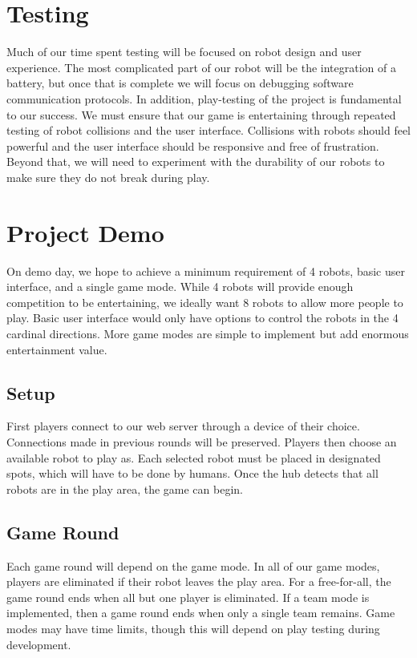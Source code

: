 \documentclass[11pt]{ieeeconf}
\begin{document}
\section{Testing}
Much of our time spent testing will be focused on robot design and user experience. The most complicated part of our robot will be the integration of a battery, but once that is complete we will focus on debugging software communication protocols. In addition, play-testing of the project is fundamental to our success. We must ensure that our game is entertaining through repeated testing of robot collisions and the user interface. Collisions with robots should feel powerful and the user interface should be responsive and free of frustration. Beyond that, we will need to experiment with the durability of our robots to make sure they do not break during play.

\section{Project Demo}

On demo day, we hope to achieve a minimum requirement of 4 robots, basic user interface, and a single game mode. While 4 robots will provide enough competition to be entertaining, we ideally want 8 robots to allow more people to play. Basic user interface would only have options to control the robots in the 4 cardinal directions. More game modes are simple to implement but add enormous entertainment value.

\subsection{Setup}
First players connect to our web server through a device of their choice. Connections made in previous rounds will be preserved. Players then choose an available robot to play as. Each selected robot must be placed in designated spots, which will have to be done by humans. Once the hub detects that all robots are in the play area, the game can begin. 

\subsection{Game Round}
Each game round will depend on the game mode. In all of our game modes, players are eliminated if their robot leaves the play area. For a free-for-all, the game round ends when all but one player is eliminated. If a team mode is implemented, then a game round ends when only a single team remains. Game modes may have time limits, though this will depend on play testing during development.
\end{document}
